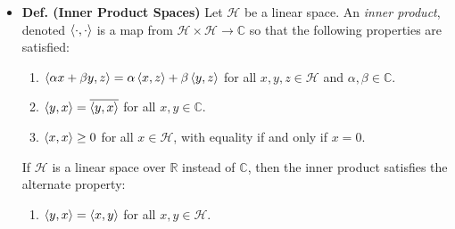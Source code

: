 \documentclass{article}
\begin{document}
\begin{itemize}
	\item \textbf{Def. (Inner Product Spaces)} Let $\mathscr{H}$ be a linear space. An \textit{inner product}, denoted $\braket{\cdot,\cdot}$ is a map from $\mathscr{H} \times \mathscr{H} \to \mathbb{C}$ so that the following properties are satisfied:
		\begin{enumerate}[itemsep =-2pt,label = (\roman{*})]
			\item $\braket{\alpha x + \beta y, z} = \alpha \braket{x, z} + \beta \braket{y, z}$ for all $x,y, z \in \mathscr{H}$ and $\alpha,\beta \in \mathbb{C}$. 
			\item $\braket{y, x} = \overline{\braket{y, x}}$ for all $x, y \in \mathbb{C}$. 
			\item $\braket{x,x} \geq 0$ for all $x \in \mathscr{H}$, with equality if and only if $x = 0$. 
		\end{enumerate}
	If $\mathscr{H}$ is a linear space over $\mathbb{R}$ instead of $\mathbb{C}$, then the inner product satisfies the alternate property: 
		\begin{enumerate}
			\item[(ii')] $\braket{y,x} = \braket{x,y}$ for all $x, y \in \mathscr{H}$. 
		\end{enumerate}
		

\end{itemize}
\end{document}
